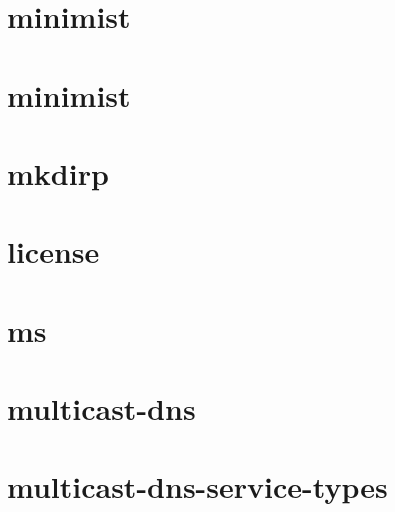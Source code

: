 \documentclass[twoside]{book}
\newcommand{\+}{\discretionary{\mbox{\scriptsize$\hookleftarrow$}}{}{}}
\begin{document}
\chapter{minimist}
\label{md__c_1_workspace_demo_src_main_script_node_modules_minimist_readme}

\chapter{minimist}
\label{md__c_1_workspace_demo_src_main_script_node_modules_mkdirp_node_modules_minimist_readme}

\chapter{mkdirp}
\label{md__c_1_workspace_demo_src_main_script_node_modules_mkdirp_readme}

\chapter{license}
\label{md__c_1_workspace_demo_src_main_script_node_modules_ms_license}

\chapter{ms}
\label{md__c_1_workspace_demo_src_main_script_node_modules_ms_readme}

\chapter{multicast-\/dns}
\label{md__c_1_workspace_demo_src_main_script_node_modules_multicast-dns__r_e_a_d_m_e}

\chapter{multicast-\/dns-\/service-\/types}
\label{md__c_1_workspace_demo_src_main_script_node_modules_multicast-dns-service-types__r_e_a_d_m_e}

\end{document}
